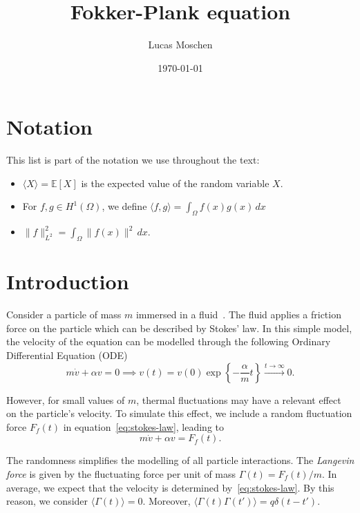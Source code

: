 \documentclass[12pt]{article}
\title{Fokker-Plank equation}
\author{Lucas Moschen}
\date{\today}
\theoremstyle{definition}
\begin{document}
\maketitle

\onehalfspacing{}
    
\tableofcontents

\section*{Notation}

This list is part of the notation we use throughout the text:

\begin{itemize}
    \item $\langle X \rangle = \mathbb{E}[X]$ is the expected value of the random variable $X$.
    \item For $f, g \in H^1(\Omega)$, we define $\langle f, g \rangle = \int_{\Omega} f(x) g(x) \, dx$
    \item $\|f\|_{L^2}^2 = \int_{\Omega} \|f(x)\|^2 \, dx$.
\end{itemize}

\section{Introduction}

Consider a particle of mass $m$ immersed in a fluid~\cite{risken1996fokker}.
The fluid applies a friction force on the particle which can be described by Stokes' law.
In this simple model, the velocity of the equation can be modelled through the following Ordinary Differential Equation (ODE)
\begin{equation}
    \label{eq:stokes-law}
    m \dot{v} + \alpha v = 0 \implies v(t) = v(0) \exp\left\{-\frac{\alpha}{m} t\right\} \overset{t \to \infty}{\to} 0.    
\end{equation}

However, for small values of $m$, thermal fluctuations may have a relevant effect on the particle's velocity.
To simulate this effect, we include a random fluctuation force $F_f(t)$ in equation~\eqref{eq:stokes-law}, leading to 
\begin{equation}
    \label{eq:fluctuation-force}
    m\dot{v} + \alpha v = F_f(t).        
\end{equation}

The randomness simplifies the modelling of all particle interactions.
The {\em Langevin force\/} is given by the fluctuating force per unit of mass $\Gamma(t) = F_f(t)/m$.
In average, we expect that the velocity is determined by~\eqref{eq:stokes-law}. 
By this reason, we consider $\langle \Gamma(t) \rangle = 0$.
Moreover, $\langle \Gamma(t) \Gamma(t') \rangle = q\delta(t - t')$. 
\end{document}
